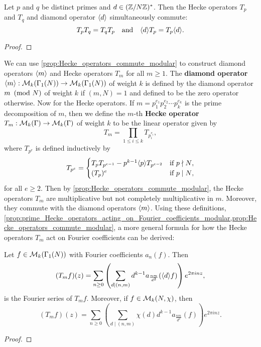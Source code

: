       \begin{proposition}\label{prop:Hecke_operators_commute_modular}
        Let $p$ and $q$ be distinct primes and $d \in (\mathbb{Z}/N\mathbb{Z})^{\ast}$. Then the Hecke operators $T_{p}$ and $T_{q}$ and diamond operator $\langle d\rangle$ simultaneously commute:
        \[
          T_{p}T_{q} = T_{q}T_{p} \quad \text{and} \quad \langle d\rangle T_{p} = T_{p}\langle d\rangle.
        \]
      \end{proposition}
      \begin{proof}
      \end{proof}

      We can use \cref{prop:Hecke_operators_commute_modular} to construct diamond operators $\langle m\rangle$ and Hecke operators $T_{m}$ for all $m \ge 1$. The \textbf{diamond operator} $\langle m\rangle:\mathcal{M}_{k}(\Gamma_{1}(N)) \to \mathcal{M}_{k}(\Gamma_{1}(N))$ of weight $k$ is defined by the diamond operator $m \ \left(\text{mod }N\right)$ of weight $k$ if $(m,N) = 1$ and defined to be the zero operator otherwise. Now for the Hecke operators. If $m = p_{1}^{e_{1}}p_{2}^{e_{2}} \cdots p_{k}^{e_{k}}$ is the prime decomposition of $m$, then we define the $m$-th \textbf{Hecke operator} $T_{m}:\mathcal{M}_{k}(\Gamma) \to \mathcal{M}_{k}(\Gamma)$ of weight $k$ to be the linear operator given by
      \[
        T_{m} = \prod_{1 \le i \le k}T_{p_{i}^{e_{i}}},
      \]
      where $T_{p^{e}}$ is defined inductively by
      \[
        T_{p^{e}} = \begin{cases} T_{p}T_{p^{e-1}}-p^{k-1}\langle p\rangle T_{p^{e-2}} & \text{if $p \nmid N$}, \\ (T_{p})^{e} & \text{if $p \mid N$}, \end{cases}
      \]
      for all $e \ge 2$. Then by \cref{prop:Hecke_operators_commute_modular}, the Hecke operators $T_{m}$ are multiplicative but not completely multiplicative in $m$. Moreover, they commute with the diamond operators $\langle m\rangle$. Using these definitions, \cref{prop:prime_Hecke_operators_acting_on_Fourier_coefficients_modular,prop:Hecke_operators_commute_modular}, a more general formula for how the Hecke operators $T_{m}$ act on Fourier coefficients can be derived:

      \begin{proposition}\label{prop:general_Hecke_operators_acting_on_Fourier_coefficients_modular}
        Let $f \in \mathcal{M}_{k}(\Gamma_{1}(N))$ with Fourier coefficients $a_{n}(f)$. Then
        \[
          (T_{m}f)(z) = \sum_{n \ge 0}\left(\sum_{d \mid (n,m)}d^{k-1}a_{\frac{nm}{d^{2}}}(\langle d\rangle f)\right)e^{2\pi inz},
        \]
        is the Fourier series of $T_{m}f$. Moreover, if $f \in \mathcal{M}_{k}(N,\chi)$, then
        \[
          (T_{m}f)(z) = \sum_{n \ge 0}\left(\sum_{d \mid (n,m)}\chi(d)d^{k-1}a_{\frac{nm}{d^{2}}}(f)\right)e^{2\pi inz}.
        \]
      \end{proposition}
      \begin{proof}
      \end{proof}

